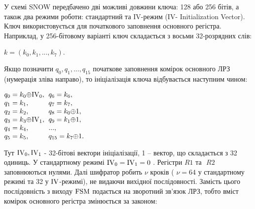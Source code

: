 \documentclass[a4paper]{article}
\newcounter{}
\newcommand\normalsubformula[1]{\text{\mathversion{normal}$#1$}}
\begin{document}
\bigskip

У схемі SNOW передбачено дві можливі довжини ключа: 128 або 256 бітів, а також
два режими роботи: стандартний та IV{}-режим (IV{}- Initialization Vector).
Ключ використовується для початкового заповнення основного регістра. Наприклад,
у 256-бітовому варіанті ключ складається з восьми 32-розрядних слів: 

{\centering
 ${k=(k_{{0}},k_{{1}},\text{.}\text{.}\text{.},k_{{7}})}$.
\par}

Якщо позначити   ${q_{{0}},q_{{1}},\text{.}\text{.}\text{.},q_{{\text{15}}}}$
початкове заповнення комірок основного ЛРЗ (нумерація зліва направо), то
ініціалізація ключа відбувається наступним чином:


\bigskip

{\centering

$\begin{matrix}{q_{{0}}=k_{{0}}{\oplus}\normalsubformula{\text{IV}}_{{0}},}\hfill\null
\\q_{{1}}=k_{{1}},\hfill\null \\q_{{2}}=k_{{2}},\hfill\null
\\q_{{3}}=k_{{3}}{\oplus}\normalsubformula{\text{IV}}_{{1}},\hfill\null
\\q_{{4}}=k_{{4}},\hfill\null \\q_{{5}}=k_{{5}},\hfill\null \end{matrix}\hfill
$   $\begin{matrix}{q_{{6}}=k_{{6}},}\hfill\null \\q_{{7}}=k_{{7}},\hfill\null
\\q_{{8}}=k_{{0}}{\oplus}1,\hfill\null \\q_{{9}}=k_{{1}}{\oplus}1,\hfill\null
\\\text{.}\text{.}\text{.},\hfill\null
\\q_{{\text{15}}}=k_{{7}}{\oplus}1\text{.}\hfill\null \end{matrix}\hfill $
\par}

Тут  ${\normalsubformula{\text{IV}}_{{0}},\normalsubformula{\text{IV}}_{{1}}}$ 
{}- 32-бітові вектори ініціалізації, 1 – вектор, що складається з 32 одиниць. У
стандартному режимі 
${\normalsubformula{\text{IV}}_{{0}}=\normalsubformula{\text{IV}}_{{1}}=0}$ .
Регістри   ${\mathit{R1}}$ та $ $ ${\mathit{R2}}$ заповнюються нулями. Далі
шифратор робить   ${\nu }$ кроків ( ${\nu =\text{64}}$ у стандартному режимі та
32 у  ${\normalsubformula{\text{IV}}}${}-режимі), не видаючи вихідної
послідовності. Замість цього послідовність з виходу 
${\normalsubformula{\text{FSM}}}$ подається на зворотний зв’язок ЛРЗ, тобто
вміст комірок основного регістра змінюється за законом:
\end{document}
